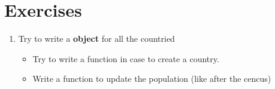 \documentclass[12pt]{article}
\begin{document}
\section{Exercises}
\begin{enumerate}
	\item Try to write a \textbf{object} for all the countried
		\begin{itemize}
			\item Try to write a function in case to create a country.
			\item Write a function to update the population (like after the cencus)
		\end{itemize}
\end{enumerate}
\printbibliography
\end{document}
